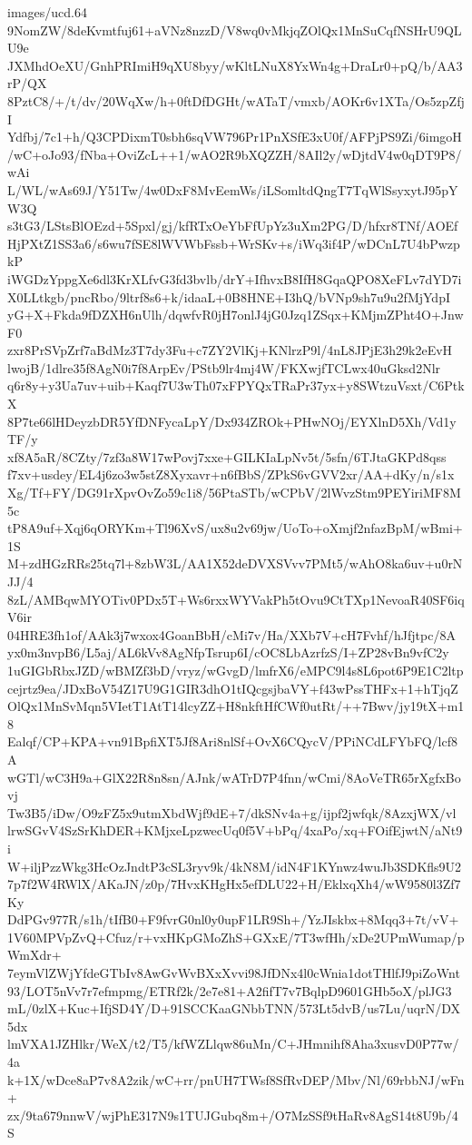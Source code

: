\begin{filecontents*}{images/ucd.64}
9NomZW/8deKvmtfuj61+aVNz8nzzD/V8wq0vMkjqZOlQx1MnSuCqfNSHrU9QLU9e
JXMhdOeXU/GnhPRImiH9qXU8byy/wKltLNuX8YxWn4g+DraLr0+pQ/b/AA3rP/QX
8PztC8/+/t/dv/20WqXw/h+0ftDfDGHt/wATaT/vmxb/AOKr6v1XTa/Os5zpZfjI
Ydfbj/7c1+h/Q3CPDixmT0sbh6sqVW796Pr1PnXSfE3xU0f/AFPjPS9Zi/6imgoH
/wC+oJo93/fNba+OviZcL++1/wAO2R9bXQZZH/8AIl2y/wDjtdV4w0qDT9P8/wAi
L/WL/wAs69J/Y51Tw/4w0DxF8MvEemWs/iLSomltdQngT7TqWlSsyxytJ95pYW3Q
s3tG3/LStsBlOEzd+5Spxl/gj/kfRTxOeYbFfUpYz3uXm2PG/D/hfxr8TNf/AOEf
HjPXtZ1SS3a6/s6wu7fSE8lWVWbFssb+WrSKv+s/iWq3if4P/wDCnL7U4bPwzpkP
iWGDzYppgXe6dl3KrXLfvG3fd3bvlb/drY+IfhvxB8IfH8GqaQPO8XeFLv7dYD7i
X0LLtkgb/pncRbo/9ltrf8s6+k/idaaL+0B8HNE+I3hQ/bVNp9sh7u9u2fMjYdpI
yG+X+Fkda9fDZXH6nUlh/dqwfvR0jH7onlJ4jG0Jzq1ZSqx+KMjmZPht4O+JnwF0
zxr8PrSVpZrf7aBdMz3T7dy3Fu+c7ZY2VlKj+KNlrzP9l/4nL8JPjE3h29k2eEvH
lwojB/1dlre35f8AgN0i7f8ArpEv/PStb9lr4mj4W/FKXwjfTCLwx40uGksd2Nlr
q6r8y+y3Ua7uv+uib+Kaqf7U3wTh07xFPYQxTRaPr37yx+y8SWtzuVsxt/C6PtkX
8P7te66lHDeyzbDR5YfDNFycaLpY/Dx934ZROk+PHwNOj/EYXlnD5Xh/Vd1yTF/y
xf8A5aR/8CZty/7zf3a8W17wPovj7xxe+GILKIaLpNv5t/5sfn/6TJtaGKPd8qss
f7xv+usdey/EL4j6zo3w5stZ8Xyxavr+n6fBbS/ZPkS6vGVV2xr/AA+dKy/n/s1x
Xg/Tf+FY/DG91rXpvOvZo59c1i8/56PtaSTb/wCPbV/2lWvzStm9PEYiriMF8M5c
tP8A9uf+Xqj6qORYKm+Tl96XvS/ux8u2v69jw/UoTo+oXmjf2nfazBpM/wBmi+1S
M+zdHGzRRs25tq7l+8zbW3L/AA1X52deDVXSVvv7PMt5/wAhO8ka6uv+u0rNJJ/4
8zL/AMBqwMYOTiv0PDx5T+Ws6rxxWYVakPh5tOvu9CtTXp1NevoaR40SF6iqV6ir
04HRE3fh1of/AAk3j7wxox4GoanBbH/cMi7v/Ha/XXb7V+cH7Fvhf/hJfjtpc/8A
yx0m3nvpB6/L5aj/AL6kVv8AgNfpTsrup6I/cOC8LbAzrfzS/I+ZP28vBn9vfC2y
1uGIGbRbxJZD/wBMZf3bD/vryz/wGvgD/lmfrX6/eMPC9l4s8L6pot6P9E1C2ltp
cejrtz9ea/JDxBoV54Z17U9G1GIR3dhO1tIQcgsjbaVY+f43wPssTHFx+1+hTjqZ
OlQx1MnSvMqn5VIetT1AtT14lcyZZ+H8nkftHfCWf0utRt/++7Bwv/jy19tX+m18
Ealqf/CP+KPA+vn91BpfiXT5Jf8Ari8nlSf+OvX6CQycV/PPiNCdLFYbFQ/lcf8A
wGTl/wC3H9a+GlX22R8n8sn/AJnk/wATrD7P4fnn/wCmi/8AoVeTR65rXgfxBovj
Tw3B5/iDw/O9zFZ5x9utmXbdWjf9dE+7/dkSNv4a+g/ijpf2jwfqk/8AzxjWX/vl
lrwSGvV4SzSrKhDER+KMjxeLpzwecUq0f5V+bPq/4xaPo/xq+FOifEjwtN/aNt9i
W+iljPzzWkg3HcOzJndtP3cSL3ryv9k/4kN8M/idN4F1KYnwz4wuJb3SDKfls9U2
7p7f2W4RWlX/AKaJN/z0p/7HvxKHgHx5efDLU22+H/EklxqXh4/wW9580l3Zf7Ky
DdPGv977R/s1h/tIfB0+F9fvrG0nl0y0upF1LR9Sh+/YzJIskbx+8Mqq3+7t/vV+
1V60MPVpZvQ+Cfuz/r+vxHKpGMoZhS+GXxE/7T3wfHh/xDe2UPmWumap/pWmXdr+
7eymVlZWjYfdeGTbIv8AwGvWvBXxXvvi98JfDNx4l0cWnia1dotTHlfJ9piZoWnt
93/LOT5nVv7r7efmpmg/ETRf2k/2e7e81+A2fifT7v7BqlpD9601GHb5oX/plJG3
mL/0zlX+Kuc+IfjSD4Y/D+91SCCKaaGNbbTNN/573Lt5dvB/us7Lu/uqrN/DX5dx
lmVXA1JZHlkr/WeX/t2/T5/kfWZLlqw86uMn/C+JHmnihf8Aha3xusvD0P77w/4a
k+1X/wDce8aP7v8A2zik/wC+rr/pnUH7TWsf8SfRvDEP/Mbv/Nl/69rbbNJ/wFn+
zx/9ta679nnwV/wjPhE317N9s1TUJGubq8m+/O7MzSSf9tHaRv8AgS14t8U9b/4S

\end{filecontents*}
